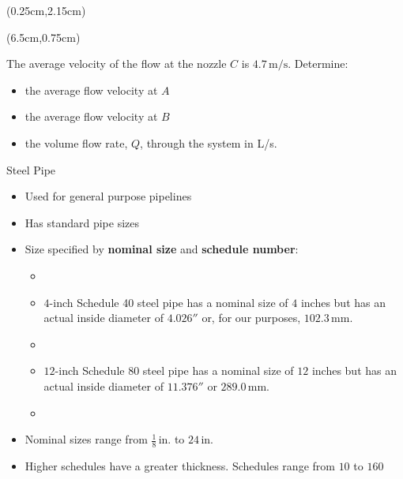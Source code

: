\documentclass[9pt,xcolor={svgnames, x11names},professionalfonts, mathserif]{beamer}
\begin{document}

\begin{frame}
	\begin{textblock*}{4cm} (0.25cm,2.15cm)
	\end{textblock*}
	\begin{textblock*}{5.75cm} (6.5cm,0.75cm)
		\begin{myexam}[colframe=example!80!black, colbacktitle=example]{}{}
			\raggedright
			The average velocity of the flow at the nozzle $C$ is $4.7\,\text{m/s}$.\parb
			Determine:
			\begin{itemize}
				\item the average flow velocity at $A$
				\item the average flow velocity at $B$
				\item the volume flow rate, $Q$, through the system in L/s.
			\end{itemize}
		\end{myexam}
		
	\end{textblock*}
\end{frame}




\begin{frame}{Steel Pipe}
	\begin{itemize}
		\item Used for general purpose pipelines
		\item Has standard pipe sizes
		\item Size specified by \textbf{nominal size} and \textbf{schedule number}:
		      \begin{itemize}
		      	\item[]\item[] $4$-inch Schedule 40 steel pipe has a nominal size of $4$ inches but has an actual inside
		      	      diameter of $4.026''$ or, for our purposes, $102.3\,\text{mm}$.
		      	\item[]\item[] $12$-inch Schedule 80 steel pipe has a nominal size of $12$ inches but has an actual inside
		      	      diameter of $11.376''$ or $289.0\,\text{mm}$.
		      	\item[]
		      \end{itemize}
		\item Nominal sizes range from $\tfrac{1}{8}\,\text{in.}$ to $24\,\text{in.}$
		\item Higher schedules have a greater thickness. Schedules range from $10$ to $160$
	\end{itemize}
\end{frame}
\end{document}
